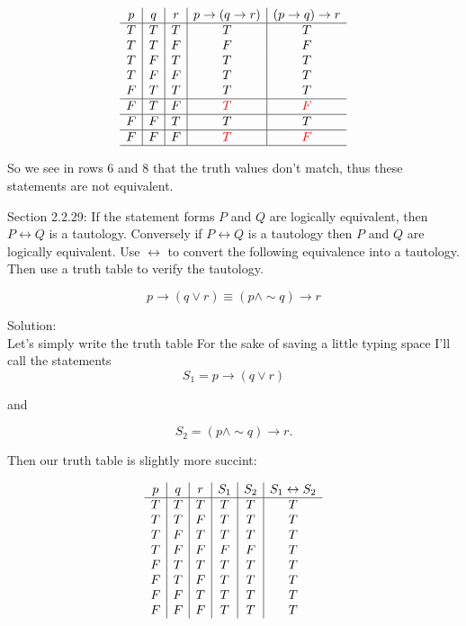 \documentclass[10 pt]{amsart}
\theoremstyle{definition}
\theoremstyle{remark}
\numberwithin{equation}{subsection}
\begin{document}
\[
\begin{array}{c | c | c | c | c}
p & q & r & p \rightarrow (q\rightarrow r) & (p\rightarrow q) \rightarrow r\\
\hline
T & T & T & T & T\\
T & T & F & F & F\\
T & F & T & T & T\\
T & F & F & T & T\\
F & T & T & T & T\\
\hline
F & T & F & \color{red}{T} & \color{red}{F}\\
\hline
F & F & T & T & T\\
\hline
F & F & F & \color{red}{T} & \color{red}{F}\\
\hline
\end{array}
\]

So we see in rows 6 and 8 that the truth values don't match, thus these statements are not equivalent.


\newpage

Section 2.2.29: If the statement forms $P$ and $Q$ are logically equivalent, then $P\leftrightarrow Q$ is a tautology.  Conversely if $P\leftrightarrow Q$ is a tautology then $P$ and $Q$ are logically equivalent.  Use $\leftrightarrow$ to convert the following equivalence into a tautology.  Then use a truth table to verify the tautology.

\[
p\rightarrow (q\vee r) \equiv (p\wedge \sim q) \rightarrow r
\]

Solution:\\ 
Let's simply write the truth table
For the sake of saving a little typing space I'll call the statements 
\[
S_1 = p \rightarrow (q\vee r)
\]

 and

\[
S_2 = (p\wedge \sim q) \rightarrow r.
\]

Then our truth table is slightly more succint:

\[
\begin{array}{c | c | c | c | c | c}
p & q & r & S_1 & S_2 & S_1 \leftrightarrow S_2\\
\hline
T & T & T & T & T & T\\
T & T & F & T & T & T\\
T & F & T & T & T & T\\
T & F & F & F & F & T\\
F & T & T & T & T & T\\
F & T & F & T & T & T\\
F & F & T & T & T & T\\
F & F & F & T & T & T\\ 
\end{array}
\]
\end{document}
